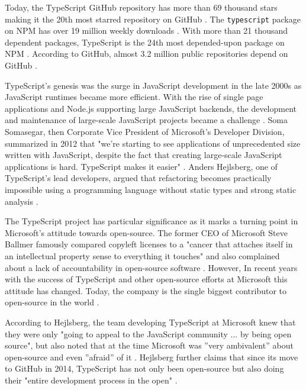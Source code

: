 \documentclass[12pt]{scrartcl}
\def\code#1{\texttt{\frenchspacing#1}}
\begin{document}
Today, the TypeScript GitHub repository has more than 69 thousand stars \cite{Repository} making it the 20th most starred repository on GitHub \cite{RepositoriesRanking}. The \code{typescript} package on NPM has over 19 million weekly downloads \cite{Package}. With more than 21 thousand dependent packages, TypeScript is the 24th most depended-upon package on NPM \cite{PackageDependents}. According to GitHub, almost 3.2 million public repositories depend on GitHub \cite{NetworkDependents}.

TypeScript's genesis was the surge in JavaScript development in the late 2000s as JavaScript runtimes became more efficient. With the rise of single page applications and Node.js supporting large JavaScript backends, the development and maintenance of large-scale JavaScript projects became a challenge \cite{Foley2012a}. Soma Somasegar, then Corporate Vice President of Microsoft’s Developer Division, summarized in 2012 that "we’re starting to see applications of unprecedented size written with JavaScript, despite the fact that creating large-scale JavaScript applications is hard. TypeScript makes it easier" \cite{Foley2012}. Anders Hejlsberg, one of TypeScript's lead developers, argued that refactoring becomes practically impossible using a programming language without static types and strong static analysis \cite{Cassel2019}.

The TypeScript project has particular significance as it marks a turning point in Microsoft's attitude towards open-source. The former CEO of Microsoft Steve Ballmer famously compared copyleft licenses to a "cancer that attaches itself in an intellectual property sense to everything it touches" \cite{ThomasCGreene2001} and also complained about a lack of accountability in open-source software \cite{JoeMcKendrick2003}. However, In recent years with the success of TypeScript and other open-source efforts at Microsoft this attitude has changed. Today, the company is the single biggest contributor to open-source in the world \cite{TomWarren2020}.

According to Hejlsberg, the team developing TypeScript at Microsoft knew that they were only "going to appeal to the JavaScript community ... by being open source", but also noted that at the time Microsoft was ”very ambivalent” about open-source and even ”afraid” of it \cite{Tung2020}. Hejlsberg further claims that since its move to GitHub in 2014, TypeScript has not only been open-source but also doing their "entire development process in the open" \cite{Tung2020}.
\end{document}

